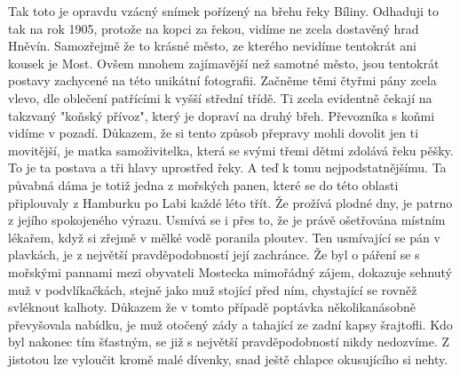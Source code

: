 
Tak toto je opravdu vzácný snímek pořízený na břehu řeky Bíliny.
Odhaduji to tak na rok 1905, protože na kopci za řekou, vidíme ne
zcela dostavěný hrad Hněvín. Samozřejmě že to krásné město, ze kterého
nevidíme tentokrát ani kousek je Most. Ovšem mnohem zajímavější než
samotné město, jsou tentokrát postavy zachycené na této unikátní
fotografii. Začněme těmi čtyřmi pány zcela vlevo, dle oblečení
patřícími k vyšší střední třídě. Ti zcela evidentně čekají na takzvaný
"koňský přívoz", který je dopraví na druhý břeh. Převozníka s koňmi
vidíme v pozadí. Důkazem, že si tento způsob přepravy mohli dovolit
jen ti movitější, je matka samoživitelka, která se svými třemi dětmi
zdolává řeku pěšky. To je ta postava a tři hlavy uprostřed řeky. A
teď k tomu nejpodstatnějšímu. Ta půvabná dáma je totiž jedna z
mořských panen, které se do této oblasti připlouvaly z Hamburku po
Labi každé léto třít. Že prožívá plodné dny, je patrno z jejího
spokojeného výrazu. Usmívá se i přes to, že je právě ošetřována
místním lékařem, když si zřejmě v mělké vodě poranila ploutev. Ten
usmívající se pán v plavkách, je z největší pravděpodobností její
zachránce. Že byl o páření se s mořskými pannami mezi obyvateli
Mostecka mimořádný zájem, dokazuje sehnutý muž v podvlíkačkách, stejně
jako muž stojící před ním, chystající se rovněž svléknout kalhoty.
Důkazem že v tomto případě poptávka několikanásobně převyšovala
nabídku, je muž otočený zády a tahající ze zadní kapsy šrajtofli. Kdo
byl nakonec tím šťastným, se již s největší pravděpodobností nikdy
nedozvíme. Z jistotou lze vyloučit kromě malé dívenky, snad ještě
chlapce okusujícího si nehty.
